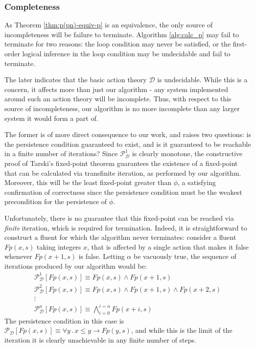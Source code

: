 \subsubsection{Completeness}

As Theorem \ref{thm:p(pn)-equiv-p} is an equivalence, the only source
of incompleteness will be failure to terminate. Algorithm \ref{alg:calc_p}
may fail to terminate for two reasons: the loop condition may never
be satisfied, or the first-order logical inference in the loop condition
may be undecidable and fail to terminate.

The later indicates that the basic action theory $\mathcal{D}$ is
undecidable. While this is a concern, it affects more than just our
algorithm - any system implemented around such an action theory will
be incomplete. Thus, with respect to this source of incompleteness,
our algorithm is no more incomplete than any larger system it would
form a part of.

The former is of more direct consequence to our work, and raises two
questions: is the persistence condition guaranteed to exist, and is
it guaranteed to be reachable in a finite number of iterations? Since
$\mathcal{P}_{\mathcal{D}}^{1}$ is clearly monotone, the constructive
proof of Tarski's fixed-point theorem \citep{cousot79constructive_tarski}
guarantees the existence of a fixed-point that can be calculated via
transfinite iteration, as performed by our algorithm. Moreover, this
will be the least fixed-point greater than $\phi$, a satisfying confirmation
of correctness since the persistence condition must be the weakest
precondition for the persistence of $\phi$.

Unfortunately, there is no guarantee that this fixed-point can be
reached via \emph{finite} iteration, which is required for termination.
Indeed, it is straightforward to construct a fluent for which the
algorithm never terminates: consider a fluent $Fp(x,s)$ taking integers
$x$, that is affected by a single action that makes it false whenever
$Fp(x+1,s)$ is false. Letting $\alpha$ be vacuously true, the sequence
of iterations produced by our algorithm would be:\begin{gather*}
\mathcal{P}_{\mathcal{D}}^{1}[Fp(x,s)]\equiv Fp(x,s)\wedge Fp(x+1,s)\\
\mathcal{P}_{\mathcal{D}}^{2}[Fp(x,s)]\equiv Fp(x,s)\wedge Fp(x+1,s)\wedge Fp(x+2,s)\\
\vdots\\
\mathcal{P}_{\mathcal{D}}^{n}[Fp(x,s)]\equiv\bigwedge_{i=0}^{i=n}Fp(x+i,s)\end{gather*}
The persistence condition in this case is $\mathcal{P}_{\mathcal{D}}[Fp(x,s)]\equiv\forall y\,.\, x\leq y\rightarrow Fp(y,s)$,
and while this is the limit of the iteration it is clearly unachievable
in any finite number of steps.

